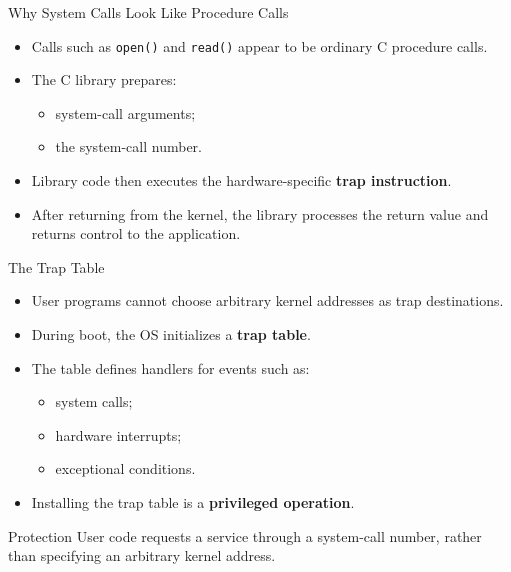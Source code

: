 \begin{frame}{Why System Calls Look Like Procedure Calls}

\begin{itemize}
    \item Calls such as \texttt{open()} and \texttt{read()} appear
          to be ordinary C procedure calls.
    \item The C library prepares:
    \begin{itemize}
        \item system-call arguments;
        \item the system-call number.
    \end{itemize}
    \item Library code then executes the hardware-specific
          \textbf{trap instruction}.
    \item After returning from the kernel, the library processes the
          return value and returns control to the application.
\end{itemize}

\end{frame}

\begin{frame}{The Trap Table}

\begin{itemize}
    \item User programs cannot choose arbitrary kernel addresses
          as trap destinations.
    \item During boot, the OS initializes a \textbf{trap table}.
    \item The table defines handlers for events such as:
    \begin{itemize}
        \item system calls;
        \item hardware interrupts;
        \item exceptional conditions.
    \end{itemize}
    \item Installing the trap table is a
          \textbf{privileged operation}.
\end{itemize}

\begin{alertblock}{Protection}
User code requests a service through a system-call number,
rather than specifying an arbitrary kernel address.
\end{alertblock}

\end{frame}

